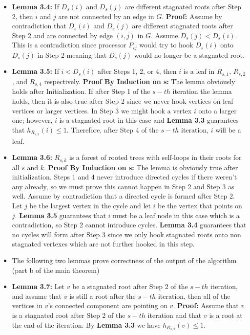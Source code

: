\documentclass[a4paper]{article}
\begin{document}
\begin{itemize}
\begin{itemize}
\item \textbf{Lemma 3.4:} If $D_s(i)$ and $D_s(j)$ are different stagnated roots after Step 2,  then $i$ and $j$ are not connected by an edge in $G$. \textbf{Proof:} Assume by contradiction that $D_s(i)$ and $D_s(j)$ are different stagnated roots after Step 2 and are connected by edge $(i, j)$ in $G$. Assume $D_s(j) < D_s(i)$. This is a contradiction since processor $P_{ij}$ would try to hook $D_s(i)$ onto $D_s(j)$ in Step 2 meaning that $D_s(j)$ would no longer be a stagnated root.

\item \textbf{Lemma 3.5:} If $i < D_s(i)$ after Steps 1, 2, or 4, then $i$ is a leaf in $R_{s, 1}$, $R_{s, 2}$, and $R_{s, 4}$ respectively. \textbf{Proof By Induction on s:} The lemma obviously holds after Initialization. If after Step 1 of the $s-th$ iteration the lemma holds, then it is also true after Step 2 since we never hook vertices on leaf vertices or larger vertices. In Step 3 we might hook a vertex $i$ onto a larger one; however, $i$ is a stagnated root in this case and \textbf{Lemma 3.3} guarantees that $h_{R_{s, 3}}(i) \leq 1$. Therefore, after Step 4 of the $s-th$ iteration, $i$ will be a leaf.

\item \textbf{Lemma 3.6:} $R_{s, k}$ is a forest of rooted trees with self-loops in their roots for all $s$ and $k$. \textbf{Proof By Induction on s:} The lemma is obviously true after initialization. Steps 1 and 4 never introduce directed cycles if there weren't any already, so we must prove this cannot happen in Step 2 and Step 3 as well. Assume by contradiction that a directed cycle is formed after Step 2. Let $j$ be the largest vertex in the cycle and let $i$ be the vertex that points on $j$. \textbf{Lemma 3.5} guarantees that $i$ must be a leaf node in this case which is a contradiction, so Step 2 cannot introduce cycles. \textbf{Lemma 3.4} guarantees that no cycles will form after Step 3 since we only hook stagnated roots onto non stagnated vertexes which are not further hooked in this step.

\item The following two lemmas prove correctness of the output of the algorithm (part b of the main theorem)

\item \textbf{Lemma 3.7:} Let $v$ be a stagnated root after Step 2 of the $s-th$ iteration, and assume that $v$ is still a root after the $s-th$ iteration, then all of the vertices in $v$'s connected component are pointing on $v$. \textbf{Proof:} Assume that $v$ is a stagnated root after Step 2 of the $s-th$ iteration and that $v$ is a root at the end of the iteration. By \textbf{Lemma 3.3} we have $h_{R_{s, 2}}(v) \leq 1$. 


\end{itemize}
\end{itemize}
\end{document}
